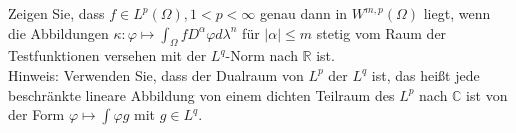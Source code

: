 \begin{exercise}

Zeigen Sie, dass $f \in L^p(\Omega), 1 < p < \infty$ genau dann in $W^{m,p}(\Omega)$ liegt, wenn die Abbildungen $\kappa: \varphi \mapsto \int_{\Omega}fD^{\alpha}\varphi d\lambda^n$ für $|\alpha| \leq m$ stetig vom Raum der Testfunktionen versehen mit der $L^q$-Norm nach $\mathbb{R}$ ist. \\

Hinweis: Verwenden Sie, dass der Dualraum von $L^p$ der $L^q$ ist, das heißt jede beschränkte lineare Abbildung von einem dichten Teilraum des $L^p$ nach $\mathbb{C}$ ist von der Form $\varphi \mapsto \int \varphi g$ mit $g \in L^q$.

\end{exercise}

\begin{solution}


\end{solution}
